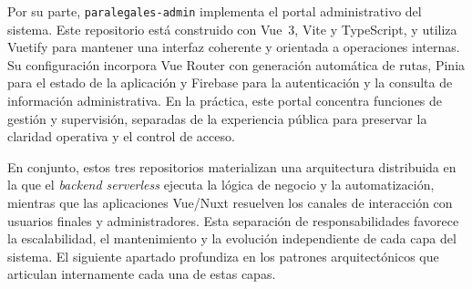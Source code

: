 Por su parte, \texttt{paralegales-admin} implementa el portal administrativo del sistema. Este repositorio está construido con Vue~3, Vite y TypeScript, y utiliza Vuetify para mantener una interfaz coherente y orientada a operaciones internas. Su configuración incorpora Vue Router con generación automática de rutas, Pinia para el estado de la aplicación y Firebase para la autenticación y la consulta de información administrativa. En la práctica, este portal concentra funciones de gestión y supervisión, separadas de la experiencia pública para preservar la claridad operativa y el control de acceso.

En conjunto, estos tres repositorios materializan una arquitectura distribuida en la que el \textit{backend serverless} ejecuta la lógica de negocio y la automatización, mientras que las aplicaciones Vue/Nuxt resuelven los canales de interacción con usuarios finales y administradores. Esta separación de responsabilidades favorece la escalabilidad, el mantenimiento y la evolución independiente de cada capa del sistema. El siguiente apartado profundiza en los patrones arquitectónicos que articulan internamente cada una de estas capas.
